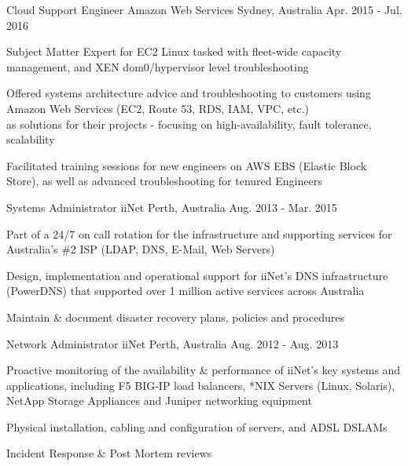 \begin{cventries}
  \cventry
    {Cloud Support Engineer} %
    {Amazon Web Services} %
    {Sydney, Australia} %
    {Apr. 2015 - Jul. 2016} %
    {
      \begin{cvitems} %
        \item {Subject Matter Expert for EC2 Linux tasked with fleet-wide capacity management, and XEN dom0/hypervisor level troubleshooting}
        \item {Offered systems architecture advice and troubleshooting to customers using Amazon Web Services (EC2, Route 53, RDS, IAM, VPC, etc.)\\
        as solutions for their projects - focusing on high-availability, fault tolerance, scalability}
        \item {Facilitated training sessions for new engineers on AWS EBS (Elastic Block Store), as well as advanced troubleshooting for tenured Engineers}
      \end{cvitems}
    }

  \cventry
    {Systems Administrator} %
    {iiNet} %
    {Perth, Australia} %
    {Aug. 2013 - Mar. 2015} %
    {
      \begin{cvitems} %
        \item {Part of a 24/7 on call rotation for the infrastructure and supporting services for Australia's \#2 ISP (LDAP, DNS, E-Mail, Web Servers)}
        \item {Design, implementation and operational support for iiNet's DNS infrastructure (PowerDNS) that supported over 1 million active services across Australia}
        \item {Maintain \& document disaster recovery plans, policies and procedures}
      \end{cvitems}
    }

  \cventry
    {Network Administrator} %
    {iiNet} %
    {Perth, Australia} %
    {Aug. 2012 - Aug. 2013} %
    {
      \begin{cvitems} %
        \item {Proactive monitoring of the availability \& performance of iiNet’s key systems and applications, including F5 BIG-IP load balancers, *NIX Servers (Linux, Solaris), NetApp Storage Appliances and Juniper networking equipment}
        \item {Physical installation, cabling and configuration of servers, and ADSL DSLAMs}
        \item {Incident Response \& Post Mortem reviews}
      \end{cvitems}
    }
\end{cventries}
